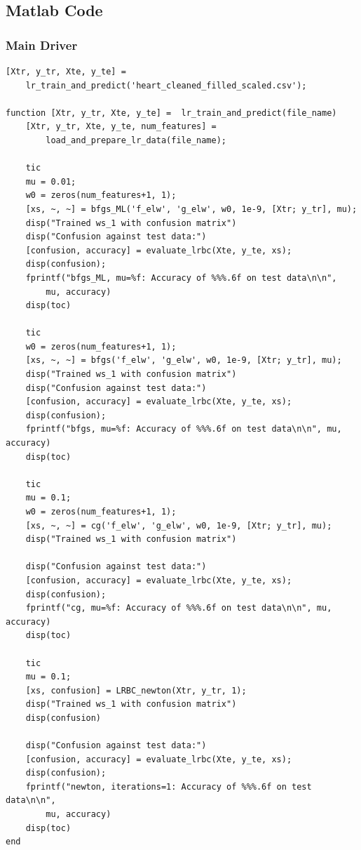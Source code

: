 \documentclass[12pt,conference]{IEEEtran}
\begin{document}
\onecolumn
\begin{appendices}
\appendix
\subsection{Matlab Code}
\subsubsection{Main Driver}
\label{AppendixA-Main}
\begin{verbatim}
[Xtr, y_tr, Xte, y_te] = 
    lr_train_and_predict('heart_cleaned_filled_scaled.csv');

function [Xtr, y_tr, Xte, y_te] =  lr_train_and_predict(file_name)
    [Xtr, y_tr, Xte, y_te, num_features] = 
        load_and_prepare_lr_data(file_name);

    tic
    mu = 0.01;
    w0 = zeros(num_features+1, 1);
    [xs, ~, ~] = bfgs_ML('f_elw', 'g_elw', w0, 1e-9, [Xtr; y_tr], mu);
    disp("Trained ws_1 with confusion matrix")
    disp("Confusion against test data:")
    [confusion, accuracy] = evaluate_lrbc(Xte, y_te, xs);
    disp(confusion);
    fprintf("bfgs_ML, mu=%f: Accuracy of %%%.6f on test data\n\n", 
        mu, accuracy)
    disp(toc)
    
    tic
    w0 = zeros(num_features+1, 1);
    [xs, ~, ~] = bfgs('f_elw', 'g_elw', w0, 1e-9, [Xtr; y_tr], mu);
    disp("Trained ws_1 with confusion matrix")
    disp("Confusion against test data:")
    [confusion, accuracy] = evaluate_lrbc(Xte, y_te, xs);
    disp(confusion);
    fprintf("bfgs, mu=%f: Accuracy of %%%.6f on test data\n\n", mu, accuracy)
    disp(toc)
    
    tic
    mu = 0.1;
    w0 = zeros(num_features+1, 1);
    [xs, ~, ~] = cg('f_elw', 'g_elw', w0, 1e-9, [Xtr; y_tr], mu);
    disp("Trained ws_1 with confusion matrix")

    disp("Confusion against test data:")
    [confusion, accuracy] = evaluate_lrbc(Xte, y_te, xs);
    disp(confusion);
    fprintf("cg, mu=%f: Accuracy of %%%.6f on test data\n\n", mu, accuracy)
    disp(toc)

    tic
    mu = 0.1;
    [xs, confusion] = LRBC_newton(Xtr, y_tr, 1);
    disp("Trained ws_1 with confusion matrix")
    disp(confusion)

    disp("Confusion against test data:")
    [confusion, accuracy] = evaluate_lrbc(Xte, y_te, xs);
    disp(confusion);
    fprintf("newton, iterations=1: Accuracy of %%%.6f on test data\n\n", 
        mu, accuracy)
    disp(toc)
end


\end{verbatim}
\end{appendices}
\end{document}
